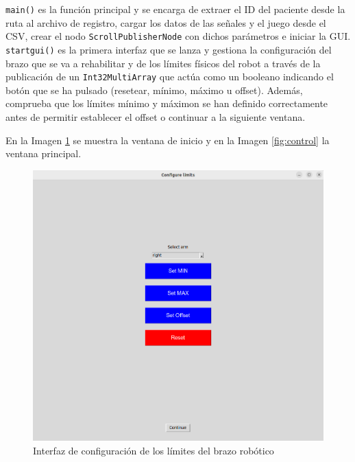 \verb|main()| es la función principal y se encarga de extraer el ID del paciente desde la ruta al archivo de registro, cargar los datos de las señales y el juego desde el CSV, crear el nodo \verb|ScrollPublisherNode| con dichos parámetros e iniciar la GUI.
\verb|startgui()| es la primera interfaz que se lanza y gestiona la configuración del brazo que se va a rehabilitar y de los límites físicos del robot a través de la publicación de un \verb|Int32MultiArray| que actúa como un booleano indicando el botón que se ha pulsado (resetear, mínimo, máximo u offset).
Además, comprueba que los límites mínimo y máximon se han definido correctamente antes de permitir establecer el offset o continuar a la siguiente ventana.

En la Imagen \ref{fig:config} se muestra la ventana de inicio y en la Imagen \ref{fig:control} la ventana principal.

\begin{figure}[ht!]
	\centering
	\begin{minipage}{0.85\linewidth}
		\centering
		\includegraphics[width=\linewidth]{figs/config_limits.png}
	\end{minipage}
	\caption[Interfaz de configuración de los límites del brazo robótico]{Interfaz de configuración de los límites del brazo robótico}
	\label{fig:config}
\end{figure}

